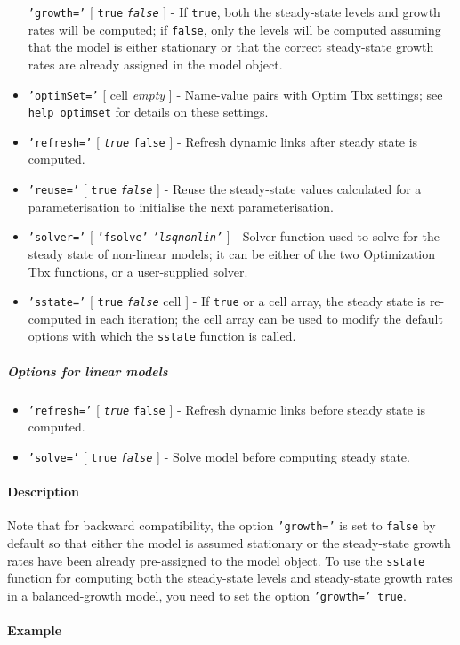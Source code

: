 \begin{itemize}
  \texttt{'growth='} {[} \texttt{true} \textbar{} \emph{\texttt{false}}
  {]} - If \texttt{true}, both the steady-state levels and growth rates
  will be computed; if \texttt{false}, only the levels will be computed
  assuming that the model is either stationary or that the correct
  steady-state growth rates are already assigned in the model object.
\item
  \texttt{'optimSet='} {[} cell \textbar{} \emph{empty} {]} - Name-value
  pairs with Optim Tbx settings; see \texttt{help optimset} for details
  on these settings.
\item
  \texttt{'refresh='} {[} \emph{\texttt{true}} \textbar{} \texttt{false}
  {]} - Refresh dynamic links after steady state is computed.
\item
  \texttt{'reuse='} {[} \texttt{true} \textbar{} \emph{\texttt{false}}
  {]} - Reuse the steady-state values calculated for a parameterisation
  to initialise the next parameterisation.
\item
  \texttt{'solver='} {[} \texttt{'fsolve'} \textbar{}
  \emph{\texttt{'lsqnonlin'}} {]} - Solver function used to solve for
  the steady state of non-linear models; it can be either of the two
  Optimization Tbx functions, or a user-supplied solver.
\item
  \texttt{'sstate='} {[} \texttt{true} \textbar{} \emph{\texttt{false}}
  \textbar{} cell {]} - If \texttt{true} or a cell array, the steady
  state is re-computed in each iteration; the cell array can be used to
  modify the default options with which the \texttt{sstate} function is
  called.
\end{itemize}

\subparagraph{Options for linear
models}\label{options-for-linear-models}

\begin{itemize}
\item
  \texttt{'refresh='} {[} \emph{\texttt{true}} \textbar{} \texttt{false}
  {]} - Refresh dynamic links before steady state is computed.
\item
  \texttt{'solve='} {[} \texttt{true} \textbar{} \emph{\texttt{false}}
  {]} - Solve model before computing steady state.
\end{itemize}

\paragraph{Description}\label{description}

Note that for backward compatibility, the option \texttt{'growth='} is
set to \texttt{false} by default so that either the model is assumed
stationary or the steady-state growth rates have been already
pre-assigned to the model object. To use the \texttt{sstate} function
for computing both the steady-state levels and steady-state growth rates
in a balanced-growth model, you need to set the option
\texttt{'growth=' true}.

\paragraph{Example}\label{example}


